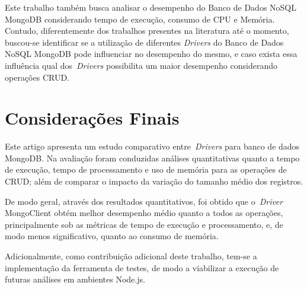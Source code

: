 \documentclass[12pt]{article}
\begin{document}
Este trabalho também busca analisar o desempenho do Banco de Dados NoSQL MongoDB considerando tempo de execução, consumo de CPU e Memória. Contudo, diferentemente dos trabalhos presentes na literatura até o momento, buscou-se identificar se a utilização de diferentes \emph{Drivers} do Banco de Dados NoSQL MongoDB pode influenciar no desempenho do mesmo, e caso exista essa influência qual dos~\emph{Drivers} possibilita um maior desempenho considerando operações CRUD.

\section{Considerações Finais}
\label{section:consideracoes}

Este artigo apresenta um estudo comparativo entre~\emph{Drivers} para banco de dados MongoDB.
Na avaliação foram conduzidas análises quantitativas quanto a tempo de execução, tempo de processamento e uso de memória para as operações de CRUD; além de comparar o impacto da variação do tamanho médio dos registros.

De modo geral, através dos resultados quantitativos, foi obtido que o~\emph{Driver} MongoClient obtém melhor desempenho médio quanto a todos as operações, principalmente sob as métricas de tempo de execução e processamento, e, de modo menos significativo, quanto ao consumo de memória.

Adicionalmente, como contribuição adicional deste trabalho, tem-se a implementação da ferramenta de testes, de modo a viabilizar a execução de futuras análises em ambientes Node.js.




\end{document}
